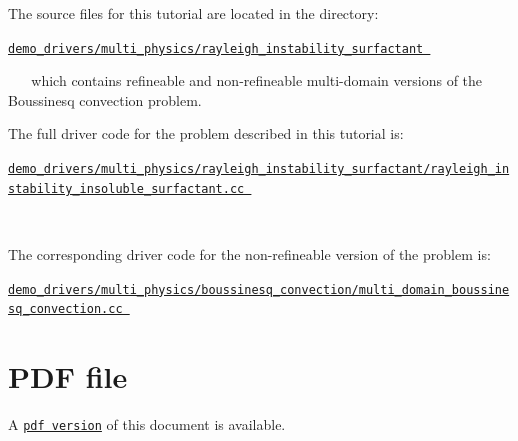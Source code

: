 \begin{DoxyItemize}
\item The source files for this tutorial are located in the directory\+:~\newline
~\newline
\begin{center} \href{../../../../demo_drivers/multi_physics/rayleigh_instability_surfactant}{\tt demo\+\_\+drivers/multi\+\_\+physics/rayleigh\+\_\+instability\+\_\+surfactant } \end{center}  ~\newline
~\newline
 which contains refineable and non-\/refineable multi-\/domain versions of the Boussinesq convection problem. ~\newline
~\newline

\item The full driver code for the problem described in this tutorial is\+:~\newline
~\newline
\begin{center} \href{
../../../../
demo_drivers/multi_physics/rayleigh_instability_surfactant/rayleigh_instability_insoluble_surfactant.cc
}{\tt demo\+\_\+drivers/multi\+\_\+physics/rayleigh\+\_\+instability\+\_\+surfactant/rayleigh\+\_\+instability\+\_\+insoluble\+\_\+surfactant.\+cc } \end{center}  ~\newline
~\newline

\item The corresponding driver code for the non-\/refineable version of the problem is\+:~\newline
~\newline
\begin{center} \href{
../../../../
demo_drivers/multi_physics/boussinesq_convection/multi_domain_boussinesq_convection.cc
}{\tt demo\+\_\+drivers/multi\+\_\+physics/boussinesq\+\_\+convection/multi\+\_\+domain\+\_\+boussinesq\+\_\+convection.\+cc } \end{center} 
\end{DoxyItemize}



 

 \hypertarget{index_pdf}{}\section{P\+D\+F file}\label{index_pdf}
A \href{../latex/refman.pdf}{\tt pdf version} of this document is available. 
